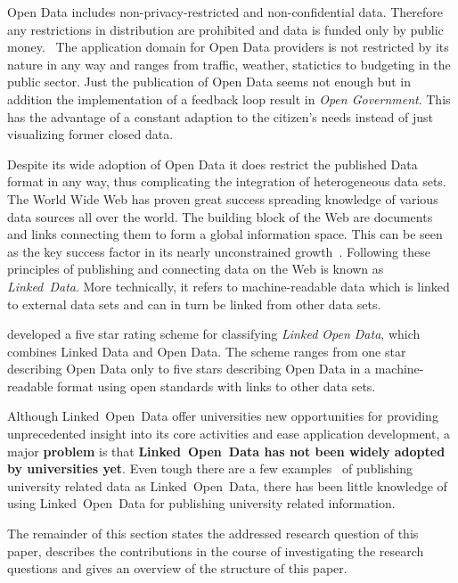 \documentclass{article}
\begin{document}
Open Data includes non-privacy-restricted and non-confidential data. Therefore any restrictions in distribution are prohibited and data is funded only by public money.~\cite{article:janssen2012benefits} The application domain for Open Data providers is not restricted by its nature in any way and ranges from traffic, weather, statictics to budgeting in the public sector. Just the publication of Open Data seems not enough but in addition the implementation of a feedback loop result in \textit{Open Government}. This has the advantage of a constant adaption to the citizen's needs instead of just visualizing former closed data. 

Despite its wide adoption of Open Data it does restrict the published Data format in any way, thus complicating the integration of heterogeneous data sets. The World Wide Web has proven great success spreading knowledge of various data sources all over the world. The building block of the Web are documents and links connecting them to form a global information space. This can be seen as the key success factor in its nearly unconstrained growth~\cite{report:jacobs-i-2004--a}. 
Following these principles of publishing and connecting data on the Web is known as \textit{Linked~Data}. More technically, it refers to machine-readable data which is linked to external data sets and can in turn be linked from other data sets. 

\cite{artivle:bernerslee-t-2006-1} developed a five star rating scheme for classifying \textit{Linked Open Data}, which combines Linked Data and Open Data. The scheme ranges from one star describing Open Data only to five stars describing Open Data in a machine-readable format using open standards with links to other data sets.

Although Linked~Open~Data offer universities new opportunities for providing unprecedented insight into its core activities and ease application development, a major \textbf{problem} is that \textbf{Linked~Open~Data has not been widely adopted by universities yet}. Even tough there are a few examples~\cite{url:linked-universities-members} of publishing university related data as Linked~Open~Data, there has been little knowledge of using Linked~Open~Data for publishing university related information. 

The remainder of this section states the addressed research question of this paper, describes the contributions in the course of investigating the research questions and gives an overview of the structure of this paper.
\end{document}
